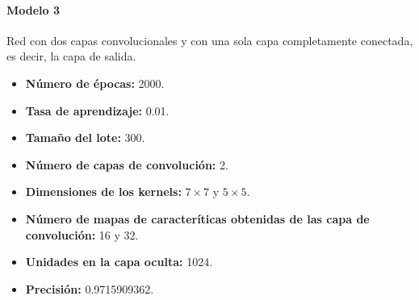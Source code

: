 \paragraph{Modelo 3}

Red con dos capas convolucionales y con una sola capa
completamente conectada, es decir, la capa de salida.

\begin{itemize}
\item \textbf{Número de épocas:} 2000.
\item \textbf{Tasa de aprendizaje:} 0.01.
\item \textbf{Tamaño del lote:} 300.
\item \textbf{Número de capas de convolución:} 2.
\item \textbf{Dimensiones de los kernels:} $7 \times 7$ y $5 \times 5$.
\item \textbf{Número de mapas de caracteríticas obtenidas de las capa de convolución:} 16 y 32.
\item \textbf{Unidades en la capa oculta:} 1024.
\item \textbf{Precisión:} 0.9715909362.
\end{itemize}

